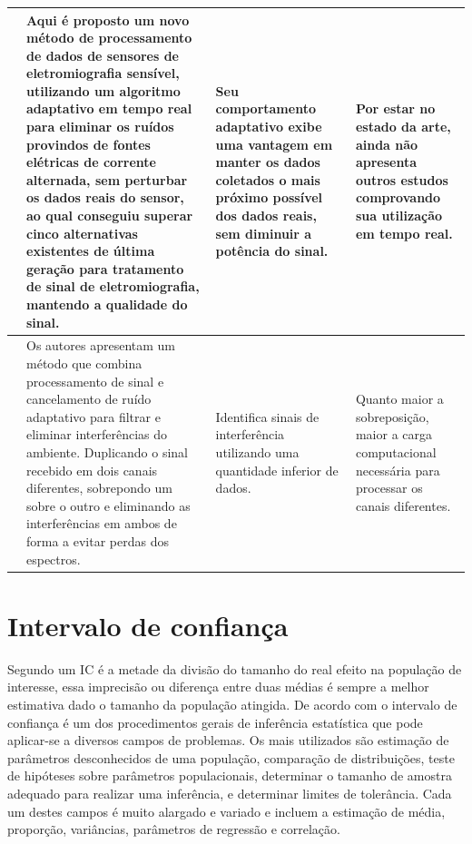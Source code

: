 \begin{longtable}{|p{2cm}|p{4cm}|p{3.5cm}|p{3.5cm}|}
    \cite{Kaan_emg} &   Aqui é proposto um novo método de processamento de dados de sensores de eletromiografia sensível, utilizando um algoritmo adaptativo em tempo real para eliminar os ruídos provindos de fontes elétricas de corrente alternada, sem perturbar os dados reais do sensor, ao qual conseguiu superar cinco alternativas existentes de última geração para tratamento de sinal de eletromiografia, mantendo a qualidade do sinal.  &  Seu comportamento adaptativo exibe uma vantagem em manter os dados coletados o mais próximo possível dos dados reais, sem diminuir a potência do sinal. & Por estar no estado da arte, ainda não apresenta outros estudos comprovando sua utilização em tempo real. \\ \hline
    
    \cite{Zhou_ambient} &   Os autores apresentam um método que combina processamento de sinal e cancelamento de ruído adaptativo para filtrar e eliminar interferências do ambiente. Duplicando o sinal recebido em dois canais diferentes, sobrepondo um sobre o outro e eliminando as interferências em ambos de forma a evitar perdas dos espectros. &   Identifica sinais de interferência utilizando uma quantidade inferior de dados. & Quanto maior a sobreposição, maior a carga computacional necessária para processar os canais diferentes. \\ \hline
    
\end{longtable}
 





\section{Intervalo de confiança}
Segundo \cite{patino2015intervalos} um IC é a metade da divisão do tamanho do real efeito na população de interesse, essa imprecisão ou diferença entre duas médias é sempre a melhor estimativa dado o tamanho da população atingida. De acordo com \cite{henriques2011dificuldades} o intervalo de confiança é um dos procedimentos gerais de inferência estatística que pode aplicar-se a diversos campos de problemas. Os mais utilizados são estimação de parâmetros desconhecidos de uma população, comparação de distribuições, teste de hipóteses sobre parâmetros populacionais, determinar o tamanho de amostra adequado para realizar uma inferência, e determinar limites de tolerância. Cada um destes campos é muito alargado e variado e incluem a estimação de média, proporção, variâncias, parâmetros de regressão e correlação.  


